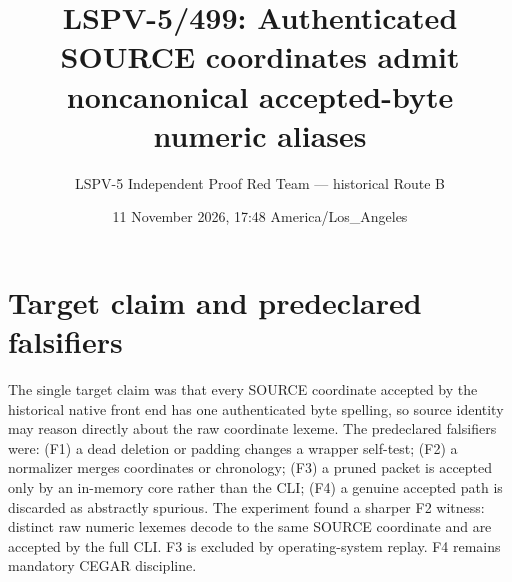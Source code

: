 \documentclass[11pt]{article}
\title{LSPV-5/499: Authenticated SOURCE coordinates admit noncanonical accepted-byte numeric aliases}
\author{LSPV-5 Independent Proof Red Team --- historical Route B}
\date{11 November 2026, 17:48 America/Los\_Angeles}
\begin{document}
\maketitle

\begin{center}
\end{center}

\section{Target claim and predeclared falsifiers}
The single target claim was that every SOURCE coordinate accepted by the
historical native front end has one authenticated byte spelling, so source
identity may reason directly about the raw coordinate lexeme.
The predeclared falsifiers were: (F1) a dead deletion or padding changes a
wrapper self-test; (F2) a normalizer merges coordinates or chronology; (F3)
a pruned packet is accepted only by an in-memory core rather than the CLI;
(F4) a genuine accepted path is discarded as abstractly spurious.  The
experiment found a sharper F2 witness: distinct raw numeric lexemes decode
to the same SOURCE coordinate and are accepted by the full CLI.  F3 is
excluded by operating-system replay.  F4 remains mandatory CEGAR discipline.
\end{document}
